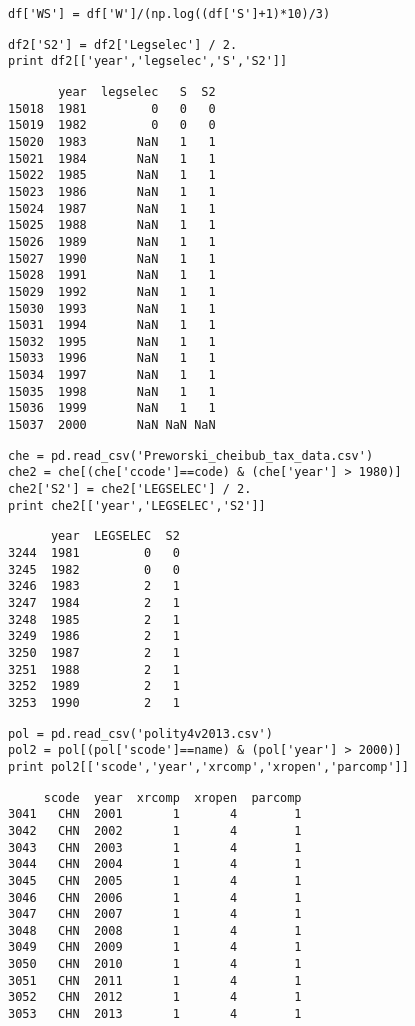 \documentclass[12pt,fleqn]{article}\usepackage{common}
\begin{document}
\begin{verbatim}
df['WS'] = df['W']/(np.log((df['S']+1)*10)/3)
\end{verbatim}


\begin{verbatim}
df2['S2'] = df2['Legselec'] / 2.
print df2[['year','legselec','S','S2']]
\end{verbatim}

\begin{verbatim}
       year  legselec   S  S2
15018  1981         0   0   0
15019  1982         0   0   0
15020  1983       NaN   1   1
15021  1984       NaN   1   1
15022  1985       NaN   1   1
15023  1986       NaN   1   1
15024  1987       NaN   1   1
15025  1988       NaN   1   1
15026  1989       NaN   1   1
15027  1990       NaN   1   1
15028  1991       NaN   1   1
15029  1992       NaN   1   1
15030  1993       NaN   1   1
15031  1994       NaN   1   1
15032  1995       NaN   1   1
15033  1996       NaN   1   1
15034  1997       NaN   1   1
15035  1998       NaN   1   1
15036  1999       NaN   1   1
15037  2000       NaN NaN NaN
\end{verbatim}

\begin{verbatim}
che = pd.read_csv('Preworski_cheibub_tax_data.csv')
che2 = che[(che['ccode']==code) & (che['year'] > 1980)]
che2['S2'] = che2['LEGSELEC'] / 2.
print che2[['year','LEGSELEC','S2']]
\end{verbatim}

\begin{verbatim}
      year  LEGSELEC  S2
3244  1981         0   0
3245  1982         0   0
3246  1983         2   1
3247  1984         2   1
3248  1985         2   1
3249  1986         2   1
3250  1987         2   1
3251  1988         2   1
3252  1989         2   1
3253  1990         2   1
\end{verbatim}

\begin{verbatim}
pol = pd.read_csv('polity4v2013.csv')
pol2 = pol[(pol['scode']==name) & (pol['year'] > 2000)]
print pol2[['scode','year','xrcomp','xropen','parcomp']]
\end{verbatim}

\begin{verbatim}
     scode  year  xrcomp  xropen  parcomp
3041   CHN  2001       1       4        1
3042   CHN  2002       1       4        1
3043   CHN  2003       1       4        1
3044   CHN  2004       1       4        1
3045   CHN  2005       1       4        1
3046   CHN  2006       1       4        1
3047   CHN  2007       1       4        1
3048   CHN  2008       1       4        1
3049   CHN  2009       1       4        1
3050   CHN  2010       1       4        1
3051   CHN  2011       1       4        1
3052   CHN  2012       1       4        1
3053   CHN  2013       1       4        1
\end{verbatim}
\end{document}
